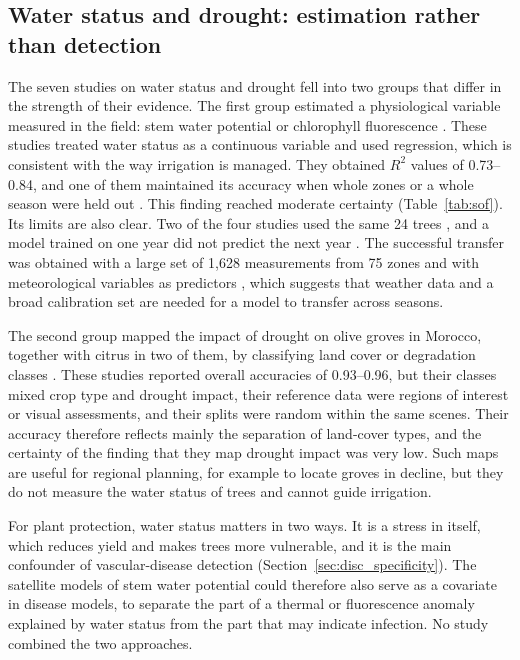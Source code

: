\documentclass[preprint,12pt]{elsarticle}
\begin{document}
\subsection{Water status and drought: estimation rather than detection}\label{sec:disc_water}
The seven studies on water status and drought fell into two groups that differ in the strength of their evidence. The first group estimated a physiological variable measured in the field: stem water potential \citep{u081,u108,u133} or chlorophyll fluorescence \citep{u106}. These studies treated water status as a continuous variable and used regression, which is consistent with the way irrigation is managed. They obtained $R^2$ values of 0.73--0.84, and one of them maintained its accuracy when whole zones or a whole season were held out \citep{u133}. This finding reached moderate certainty (Table~\ref{tab:sof}). Its limits are also clear. Two of the four studies used the same 24 trees \citep{u081,u108}, and a model trained on one year did not predict the next year \citep{u081}. The successful transfer was obtained with a large set of 1{,}628 measurements from 75 zones and with meteorological variables as predictors \citep{u133}, which suggests that weather data and a broad calibration set are needed for a model to transfer across seasons.

The second group mapped the impact of drought on olive groves in Morocco, together with citrus in two of them, by classifying land cover or degradation classes \citep{u105,u138,u135}. These studies reported overall accuracies of 0.93--0.96, but their classes mixed crop type and drought impact, their reference data were regions of interest or visual assessments, and their splits were random within the same scenes. Their accuracy therefore reflects mainly the separation of land-cover types, and the certainty of the finding that they map drought impact was very low. Such maps are useful for regional planning, for example to locate groves in decline, but they do not measure the water status of trees and cannot guide irrigation.

For plant protection, water status matters in two ways. It is a stress in itself, which reduces yield and makes trees more vulnerable, and it is the main confounder of vascular-disease detection (Section~\ref{sec:disc_specificity}). The satellite models of stem water potential could therefore also serve as a covariate in disease models, to separate the part of a thermal or fluorescence anomaly explained by water status from the part that may indicate infection. No study combined the two approaches.
\end{document}
